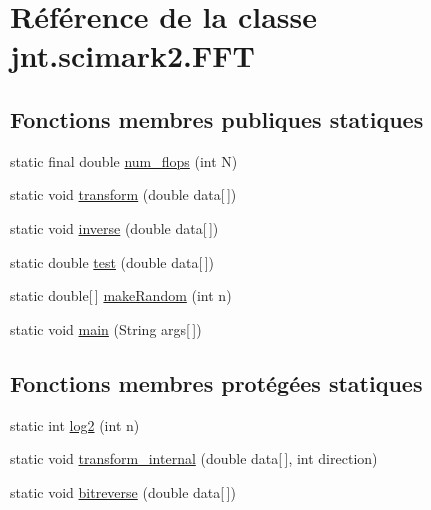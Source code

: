 \hypertarget{classjnt_1_1scimark2_1_1FFT}{\section{Référence de la classe jnt.\-scimark2.\-F\-F\-T}
\label{classjnt_1_1scimark2_1_1FFT}
}
\subsection*{Fonctions membres publiques statiques}
\begin{DoxyCompactItemize}
\item 
static final double \hyperlink{classjnt_1_1scimark2_1_1FFT_af37dd4710bd53919b3363f4b89a3656a}{num\-\_\-flops} (int N)
\item 
static void \hyperlink{classjnt_1_1scimark2_1_1FFT_adc8883cded0314fd25e7262556292e18}{transform} (double data\mbox{[}$\,$\mbox{]})
\item 
static void \hyperlink{classjnt_1_1scimark2_1_1FFT_ad1a05ec207c8d6d33820bb815dcbe3be}{inverse} (double data\mbox{[}$\,$\mbox{]})
\item 
static double \hyperlink{classjnt_1_1scimark2_1_1FFT_a19c0ea66821157159f2d86e3bf44224d}{test} (double data\mbox{[}$\,$\mbox{]})
\item 
static double\mbox{[}$\,$\mbox{]} \hyperlink{classjnt_1_1scimark2_1_1FFT_a6fead8a3dcd84b67736966ff134fe36e}{make\-Random} (int n)
\item 
static void \hyperlink{classjnt_1_1scimark2_1_1FFT_aaebf42eaf342d0396fc51267e2fd41cb}{main} (String args\mbox{[}$\,$\mbox{]})
\end{DoxyCompactItemize}
\subsection*{Fonctions membres protégées statiques}
\begin{DoxyCompactItemize}
\item 
static int \hyperlink{classjnt_1_1scimark2_1_1FFT_a2578b8c76dbb87921a4d51f9a2c49579}{log2} (int n)
\item 
static void \hyperlink{classjnt_1_1scimark2_1_1FFT_a1498281e611f0243a7a77b2e4589df4c}{transform\-\_\-internal} (double data\mbox{[}$\,$\mbox{]}, int direction)
\item 
static void \hyperlink{classjnt_1_1scimark2_1_1FFT_ae6235e2e9f50365bcc1cd951b0090810}{bitreverse} (double data\mbox{[}$\,$\mbox{]})
\end{DoxyCompactItemize}


